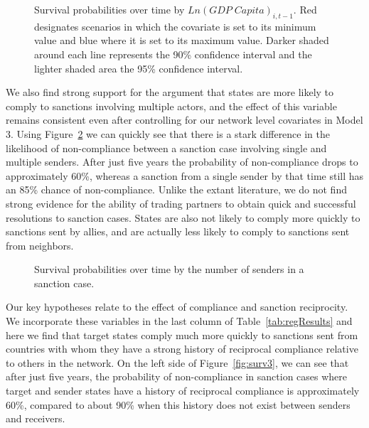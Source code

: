 \begin{figure}[ht]
	\centering
	\caption{Survival probabilities over time by $Ln(GDP \; Capita)_{i,t-1}$. Red designates scenarios in which the covariate is set to its minimum value and blue where it is set to its maximum value. Darker shaded around each line represents the 90\% confidence interval and the lighter shaded area the 95\% confidence interval.}

        \resizebox{.55\textwidth}{!}{}	


	
	\label{fig:monSurv}
\end{figure}

We also find strong support for the argument that states are more likely to comply to sanctions involving multiple actors, and the effect of this variable remains consistent even after controlling for our network level covariates in Model 3. Using Figure~\ref{fig:nosSurv} we can quickly see that there is a stark difference in the likelihood of non-compliance between a sanction case involving single and multiple senders. After just five years the probability of non-compliance drops to approximately 60\%, whereas a sanction from a single sender by that time still has an 85\% chance of non-compliance. Unlike the extant literature, we do not find strong evidence for the ability of trading partners to obtain quick and successful resolutions to sanction cases. States are also not likely to comply more quickly to sanctions sent by allies, and are actually less likely to comply to sanctions sent from neighbors. 

\begin{figure}[ht]
	\centering
	\caption{Survival probabilities over time by the number of senders in a sanction case.}
	\resizebox{0.55\textwidth}{!}{}
	\label{fig:nosSurv}
\end{figure}

Our key hypotheses relate to the effect of compliance and sanction reciprocity. We incorporate these variables in the last column of Table~\ref{tab:regResults} and here we find that target states comply much more quickly to sanctions sent from countries with whom they have a strong history of reciprocal compliance relative to others in the network. On the left side of Figure~\ref{fig:surv3}, we can see that after just five years, the probability of non-compliance in sanction cases where target and sender states have a history of reciprocal compliance is approximately 60\%, compared to about 90\% when this history does not exist between senders and receivers. 

